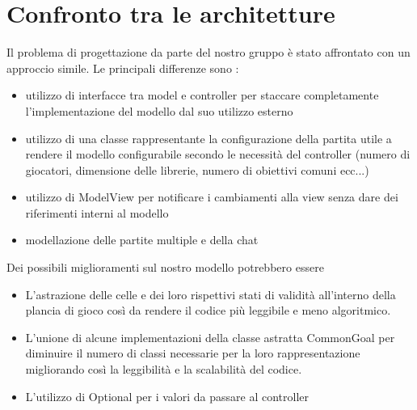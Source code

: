 \documentclass[12pt]{article}
\begin{document}
\section{Confronto tra le architetture}

Il problema di progettazione da parte del nostro gruppo è stato affrontato con un approccio simile. 
Le principali differenze sono :
\begin{itemize}
    \item utilizzo di interfacce tra model e controller per staccare completamente l'implementazione del modello dal suo utilizzo esterno
    \item utilizzo di una classe rappresentante la configurazione della partita utile a rendere il modello configurabile secondo le necessità del controller (numero di giocatori, dimensione delle librerie, numero di obiettivi comuni ecc...)
    \item utilizzo di ModelView per notificare i cambiamenti alla view senza dare dei riferimenti interni al modello
    \item modellazione delle partite multiple e della chat 
\end{itemize}


Dei possibili miglioramenti sul nostro modello potrebbero essere 


\begin{itemize}
    \item L'astrazione delle celle e dei loro rispettivi stati di validità all'interno della plancia di gioco così da rendere il codice più leggibile e meno algoritmico. 
    \item L'unione di alcune implementazioni della classe astratta CommonGoal per diminuire il numero di classi necessarie per la loro rappresentazione migliorando così la leggibilità e la scalabilità del codice.
    \item L'utilizzo di Optional per i valori da passare al controller
\end{itemize}
\end{document}
